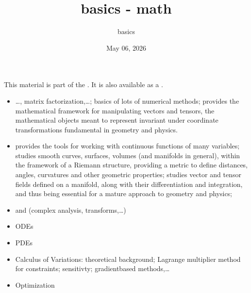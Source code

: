 \documentclass[letterpaper,10pt,english]{jupyterBook}
\title{basics - math}
\date{May 06, 2026}
\author{basics}
\begin{document}
\pagestyle{empty}
\sphinxmaketitle
\pagestyle{plain}
\sphinxtableofcontents
\pagestyle{normal}
\label{\detokenize{intro::doc}}


\sphinxAtStartPar
This material is part of the . It is also available as a .



\sphinxAtStartPar
{}
\begin{itemize}
\item {} 
\sphinxAtStartPar
{} …, matrix factorization,…; basics of lots of numerical methods;  provides the mathematical framework for manipulating vectors and tensors, the mathematical objects meant to represent  \sphinxhyphen{} invariant under coordinate transformations \sphinxhyphen{} fundamental in geometry and physics.

\item {} 
\sphinxAtStartPar
{} provides the tools for working with continuous functions of many variables;  studies smooth curves, surfaces, volumes (and manifolds in general), within the framework of a Riemann structure, providing a metric to define distances, angles, curvatures and other geometric properties;  studies vector and tensor fields defined on a manifold, along with their differentiation and integration, and thus being essential for a mature approach to geometry and physics;

\item {} 
\sphinxAtStartPar
{} and  (complex analysis, transforms,…)

\item {} 
\sphinxAtStartPar
ODEs

\item {} 
\sphinxAtStartPar
PDEs

\item {} 
\sphinxAtStartPar
Calculus of Variations: theoretical background; Lagrange multiplier method for constraints; sensitivty; gradient\sphinxhyphen{}based methods,…

\item {} 
\sphinxAtStartPar
Optimization

\end{itemize}
\end{document}

